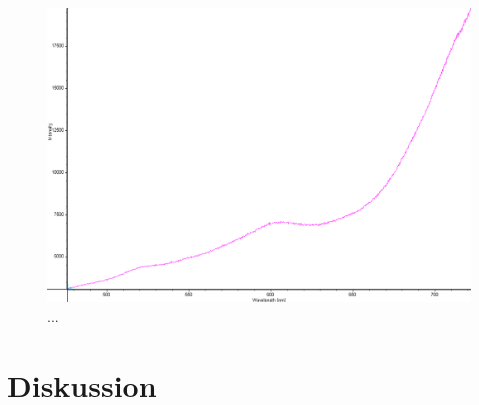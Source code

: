 \documentclass[a4paper]{article}
\begin{document}
\FloatBarrier
\begin{figure}[h!]
	\centering
	\includegraphics[width=\linewidth]{data/spektra_kristall1_optAx_inv}
	\caption{...}
	\label{fig:}
\end{figure}
\FloatBarrier

\section{Diskussion}

 
 {}
 
\end{document}
